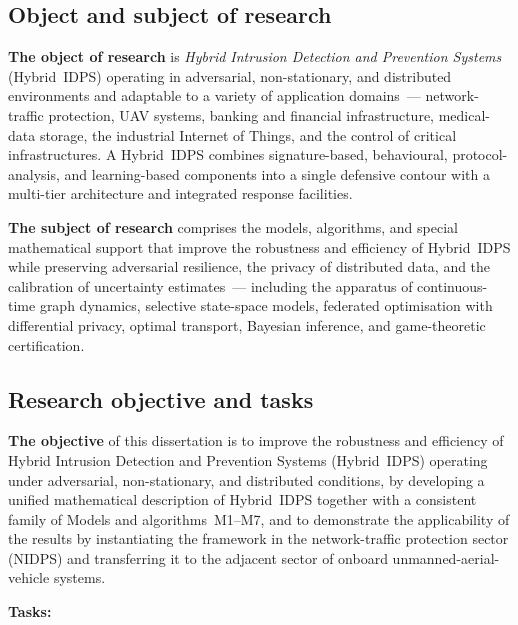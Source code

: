 \documentclass[12pt,a5paper]{article}
\begin{document}
\subsection*{Object and subject of research}

\textbf{The object of research} is \emph{Hybrid Intrusion
Detection and Prevention Systems} (Hybrid~IDPS) operating in
adversarial, non-stationary, and distributed environments and
adaptable to a variety of application domains~---
network-traffic protection, UAV systems, banking and financial
infrastructure, medical-data storage, the industrial Internet
of Things, and the control of critical infrastructures. A
Hybrid~IDPS combines signature-based, behavioural,
protocol-analysis, and learning-based components into a single
defensive contour with a multi-tier architecture and integrated
response facilities.

\textbf{The subject of research} comprises the models,
algorithms, and special mathematical support that improve the
robustness and efficiency of Hybrid~IDPS while preserving
adversarial resilience, the privacy of distributed data, and
the calibration of uncertainty estimates~--- including the
apparatus of continuous-time graph dynamics, selective
state-space models, federated optimisation with differential
privacy, optimal transport, Bayesian inference, and
game-theoretic certification.

\subsection*{Research objective and tasks}

\textbf{The objective} of this dissertation is to improve the
robustness and efficiency of Hybrid Intrusion Detection and
Prevention Systems (Hybrid~IDPS) operating under adversarial,
non-stationary, and distributed conditions, by developing a
unified mathematical description of Hybrid~IDPS together with
a consistent family of Models and algorithms~M1--M7, and to
demonstrate the applicability of the results by instantiating
the framework in the network-traffic protection sector (NIDPS)
and transferring it to the adjacent sector of onboard
unmanned-aerial-vehicle systems.

\textbf{Tasks:}
\end{document}
